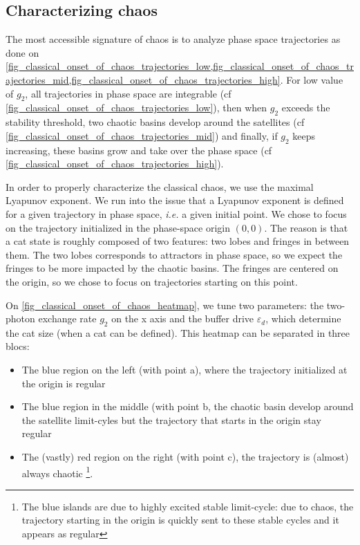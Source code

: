 \documentclass[aps,prx,reprint,floatfix,amsmath,amssymb,longbibliography]{revtex4-2}
\newcommand{\eps}{\varepsilon}
\begin{document}
\subsection{Characterizing chaos}
\label{subsec:chaos_lyap}

The most accessible signature of chaos is to analyze phase space trajectories as done on \cref{fig_classical_onset_of_chaos_trajectories_low,fig_classical_onset_of_chaos_trajectories_mid,fig_classical_onset_of_chaos_trajectories_high}. For low value of $g_2$, all trajectories in phase space are integrable (cf \cref{fig_classical_onset_of_chaos_trajectories_low}), then when $g_2$ exceeds the stability threshold, two chaotic basins develop around the satellites (cf \cref{fig_classical_onset_of_chaos_trajectories_mid}) and finally, if $g_2$ keeps increasing, these basins grow and take over the phase space (cf \cref{fig_classical_onset_of_chaos_trajectories_high}).

In order to properly characterize the classical chaos, we use the maximal Lyapunov exponent. We run into the issue that a Lyapunov exponent is defined for a given trajectory in phase space, \textit{i.e.} a given initial point. We chose to focus on the trajectory initialized in the phase-space origin $(0,0)$. The reason is that a cat state is roughly composed of two features: two lobes and fringes in between them. The two lobes corresponds to attractors in phase space, so we expect the fringes to be more impacted by the chaotic basins. The fringes are centered on the origin, so we chose to focus on trajectories starting on this point.

On \cref{fig_classical_onset_of_chaos_heatmap}, we tune two parameters: the two-photon exchange rate $g_2$ on the x axis and the buffer drive $\eps_d$, which determine the cat size (when a cat can be defined). This heatmap can be separated in three blocs:
\begin{itemize}
    \item The blue region on the left (with point a), where the trajectory initialized at the origin is regular
    \item The blue region in the middle (with point b, the chaotic basin develop around the satellite limit-cyles but the trajectory that starts in the origin stay regular
    \item The (vastly) red region on the right (with point c), the trajectory is (almost) always chaotic \footnote{The blue islands are due to highly excited stable limit-cycle: due to chaos, the trajectory starting in the origin is quickly sent to these stable cycles and it appears as regular}.
\end{itemize}
\end{document}
